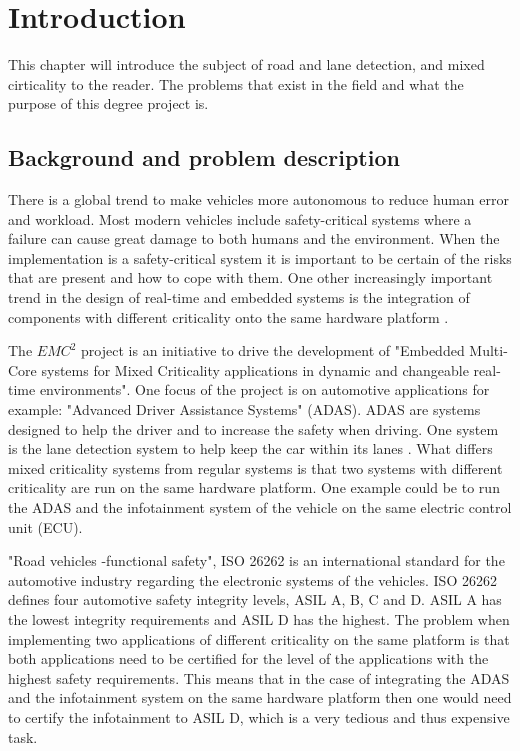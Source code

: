 \chapter{Introduction}
\label{sec:introduction}
This chapter will introduce the subject of road and lane detection, and mixed cirticality to the reader. The problems that exist in the field and what the purpose of this degree project is.


\section{Background and problem description}
There is a global trend to make vehicles more autonomous to reduce human error and workload. Most modern vehicles include safety-critical systems where a failure can cause great damage to both humans and the environment. When the implementation is a safety-critical system it is important to be certain of the risks that are present and how to cope with them. One other increasingly important trend in the design of real-time and embedded systems is the integration of components with different criticality onto the same hardware platform \cite{burns2013mixed}.
  


The $EMC^2$ project \cite{eu} is an initiative to drive the development of "Embedded Multi-Core systems for Mixed Criticality applications in dynamic and changeable real-time environments". One focus of the project is on automotive applications for example: "Advanced Driver Assistance Systems" (ADAS). ADAS are systems designed to help the driver and to increase the safety when driving. One system is the lane detection system to help keep the car within its lanes \cite{BarHillel2014}. What differs mixed criticality systems from regular systems is that two systems with different criticality are run on the same hardware platform. One example could be to run the ADAS and the infotainment system of the vehicle on the same electric control unit (ECU).


"Road vehicles -functional safety", ISO 26262 is an international standard for the automotive industry regarding the electronic systems of the vehicles. ISO 26262 defines four automotive safety integrity levels, ASIL A, B, C and D. ASIL A has the lowest integrity requirements and ASIL D has the highest. The problem when implementing two applications of different criticality on the same platform is that both applications need to be certified for the level of the applications with the highest safety requirements. This means that in the case of integrating the ADAS and the infotainment system on the same hardware platform then one would need to certify the infotainment to ASIL D, which is a very tedious and thus expensive task.

